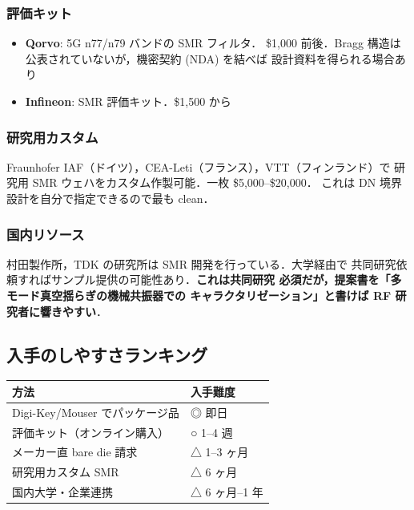 \documentclass[11pt,a4paper]{article}
\begin{document}
\subsubsection{評価キット}

\begin{itemize}
\item \textbf{Qorvo}: 5G n77/n79 バンドの SMR フィルタ．
\$1,000 前後．Bragg 構造は公表されていないが，機密契約 (NDA) を結べば
設計資料を得られる場合あり
\item \textbf{Infineon}: SMR 評価キット．\$1,500 から
\end{itemize}

\subsubsection{研究用カスタム}

Fraunhofer IAF（ドイツ），CEA-Leti（フランス），VTT（フィンランド）で
研究用 SMR ウェハをカスタム作製可能．一枚 \$5,000--\$20,000．
これは DN 境界設計を自分で指定できるので最も clean．

\subsubsection{国内リソース}

村田製作所，TDK の研究所は SMR 開発を行っている．大学経由で
共同研究依頼すればサンプル提供の可能性あり．\textbf{これは共同研究
必須だが，提案書を「多モード真空揺らぎの機械共振器での
キャラクタリゼーション」と書けば RF 研究者に響きやすい}．

\subsection{入手のしやすさランキング}

\begin{center}
\begin{tabular}{ll}
\toprule
方法 & 入手難度 \\
\midrule
Digi-Key/Mouser でパッケージ品 & ◎ 即日 \\
評価キット（オンライン購入）& ○ 1--4 週 \\
メーカー直 bare die 請求 & △ 1--3 ヶ月 \\
研究用カスタム SMR & △ 6 ヶ月 \\
国内大学・企業連携 & △ 6 ヶ月--1 年 \\
\bottomrule
\end{tabular}
\end{center}
\end{document}
